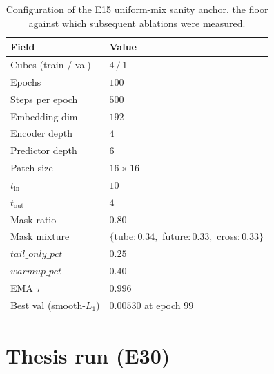 \begin{table}[htbp]
\centering
\begin{tabular}{ll}
\toprule
Field & Value \\
\midrule
Cubes (train / val)         & $4 \,/\, 1$ \\
Epochs                      & $100$ \\
Steps per epoch             & $500$ \\
Embedding dim               & $192$ \\
Encoder depth               & $4$ \\
Predictor depth             & $6$ \\
Patch size                  & $16 \times 16$ \\
$t_{\text{in}}$             & $10$ \\
$t_{\text{out}}$            & $4$ \\
Mask ratio                  & $0.80$ \\
Mask mixture                & $\{$tube$:0.34,$ future$:0.33,$ cross$:0.33\}$ \\
$\mathit{tail\_only\_pct}$  & $0.25$ \\
$\mathit{warmup\_pct}$      & $0.40$ \\
EMA $\tau$                  & $0.996$ \\
Best val (smooth-$L_{1}$)   & $0.00530$ at epoch $99$ \\
\bottomrule
\end{tabular}
\caption{Configuration of the E15 uniform-mix sanity anchor, the
floor against which subsequent ablations were measured.}
\label{tab:cfg-e15}
\end{table}

\section{Thesis run (E30)}
\label{app:cfg-e30}


